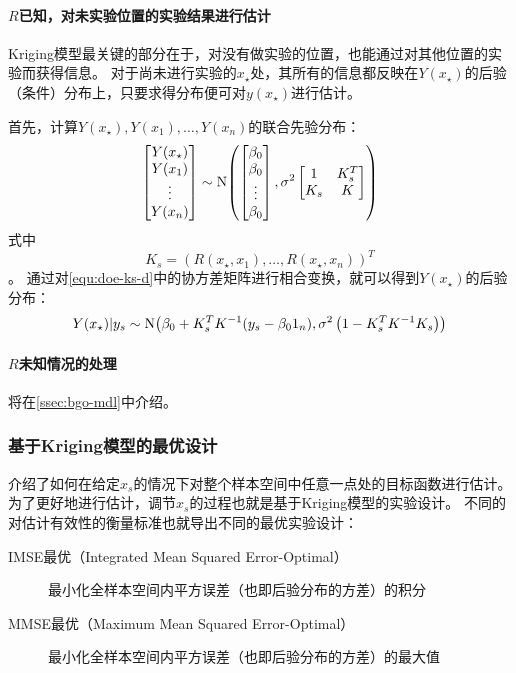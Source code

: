 \documentclass[index]{subfiles}
\begin{document}
\paragraph{$R$已知，对未实验位置的实验结果进行估计}
Kriging模型最关键的部分在于，对没有做实验的位置，也能通过对其他位置的实验而获得信息。
对于尚未进行实验的$x_\star$处，其所有的信息都反映在$Y(x_\star)$的后验（条件）分布上，只要求得分布便可对$y(x_\star)$进行估计。

首先，计算$Y(x_\star),Y(x_1),\ldots,Y(x_n)$的联合先验分布：
\begin{equation}\label{equ:doe-ks-d}
  \begin{bmatrix} Y(x_\star) \\ Y(x_1) \\ \vdots \\ Y(x_n) \end{bmatrix}
  \sim \Normal{
    \begin{bmatrix} \beta_0 \\ \beta_0 \\ \vdots \\ \beta_0 \end{bmatrix}
  }{\sigma^2
    \begin{bmatrix}
      1 & K_s^T \\
      K_s & K
    \end{bmatrix}
  }
\end{equation}
式中
\begin{equation}\label{equ:doe-ks}
  K_s = \left(R(x_\star, x_1), \ldots, R(x_\star, x_n)\right)^T
\end{equation}
。
通过对\cref{equ:doe-ks-d}中的协方差矩阵进行相合变换\cite{sacks1989}，就可以得到$Y(x_\star)$的后验分布：
\begin{equation}\label{equ:doe-y}
  Y(x_\star)|y_s \sim \Normal{\beta_0 + K_s^T K^{-1} (y_s - \beta_0 \one_n)}{\sigma^2 \left(1 - K_s^T K^{-1} K_s\right)}
\end{equation}

\paragraph{$R$未知情况的处理} 将在\cref{ssec:bgo-mdl}中介绍。

\subsubsection{基于Kriging模型的最优设计}\label{sssec:doe-k-o}
介绍了如何在给定$x_s$的情况下对整个样本空间中任意一点处的目标函数进行估计。
为了更好地进行估计，调节$x_s$的过程也就是基于Kriging模型的实验设计\cite{pronzato2012}。
不同的对估计有效性的衡量标准也就导出不同的最优实验设计：
\begin{description}
  \item[IMSE最优（Integrated Mean Squared Error-Optimal）]\cite{sacks1989} 最小化全样本空间内平方误差（也即后验分布的方差）的积分
  \item[MMSE最优（Maximum Mean Squared Error-Optimal）]\cite{sacks1989} 最小化全样本空间内平方误差（也即后验分布的方差）的最大值
\end{description}
\end{document}
